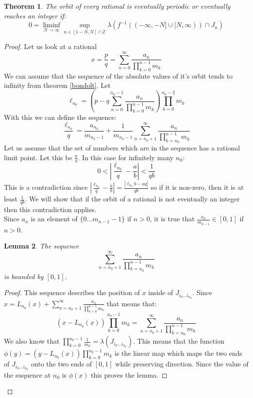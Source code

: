 \documentclass{article}
\newtheorem{theorem}{Theorem}[section]
\newtheorem{lemma}[theorem]{Lemma}
\begin{document}
\begin{theorem}
The orbit of every rational is eventually periodic or eventually reaches an integer if:\[
0 = \liminf_{N\rightarrow \infty} \sup_{n\in [1-N,N]\cap \mathbb{Z}} \lambda (f^{-1}( (-\infty, -N] \cup [N, \infty)) \cap J_n)
\] 
\end{theorem}

\begin{proof}
Let us look at a rational \[x = \frac{p}{q} = \sum_{n=0}^{\infty} \frac{a_n}{\prod_{k=0}^{n-1}m_k}\]
We can assume that the sequence of the absolute values of it's orbit tends to infinity from theorem \ref{bondolt}. Let \[ \ell_{n_0} = (p - q \sum_{n=0}^{n_0-1} \frac{a_n}{\prod_{k=0}^{n-1}m_k})\prod_{k=0}^{n_0 - 2} m_k
\]
With this we can define the sequence:\[
\frac{\ell_{n_0}}{q} = \frac{a_{n_0}}{m_{n_0-1}} + \frac{1}{m_{n_0-1}}\sum_{n=n_0+1}^{\infty} \frac{a_n}{\prod_{k=n_0}^{n-1}m_k}
\]
Let us assume that the set of numbers which are in the sequence has a rational limit point. Let this be $\frac{a}{b}$. In this case for infinitely many $n_0$:
\[
0 < | \frac{\ell_{n_0}}{q} - \frac{a}{b} | < \frac{1}{qb} 
\]
This is a contradiction since $| \frac{\ell_{n_0}}{q} - \frac{a}{b} | = \frac{|\ell_{n_0}b - aq|}{qb}$ so if it is non-zero, then it is at least $\frac{1}{qb}$. We will show that if the orbit of a rational is not eventually an integer then this contradiction applies.\\

Since $a_n$ is an element of $\{0...m_{n-1}-1\}$ if $n>0$, it is true that $\frac{a_n}{m_{n-1}} \in [0,1]$ if $n>0$.

\begin{lemma}
The sequence \[\sum_{n=n_0+1}^{\infty} \frac{a_n}{\prod_{k=n_0}^{n-1}m_k}\] is bounded by $[0,1]$.
\end{lemma}

\begin{proof}
This sequence describes the position of $x$ inside of $J_{i_0...i_{n_0}}$. Since $x = L_{n_0}(x) + \sum_{n=n_0+1}^{\infty} \frac{a_n}{\prod_{k=0}^{n-1}m_k}$ that means that:\[
(x - L_{n_0}(x))\prod_{k=0}^{n_0-1}m_k = \sum_{n=n_0+1}^{\infty} \frac{a_n}{\prod_{k=n_0}^{n-1}m_k} 
\]
We also know that $\prod_{k=0}^{n_0-1} \frac{1}{m_k} = \lambda(J_{i_0...i_{n_0}})$. This means that the function $\phi(y) = (y - L_{n_0}(x))\prod_{k=0}^{n_0-1}m_k$ is the linear map which maps the two ends of $J_{i_0...i_{n_0}}$ onto the two ends of $[0,1]$ while preserving direction. Since the value of the suquence at $n_0$ is $\phi(x)$ this proves the lemma.
\end{proof}


\end{proof}
\end{document}
